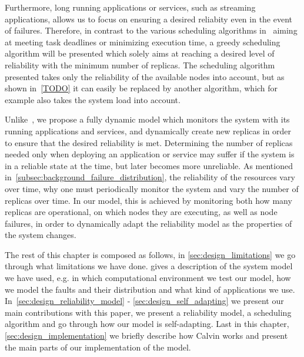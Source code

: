 \documentclass{cslthse-msc}
\begin{document}
Furthermore, long running applications or services, such as streaming applications, allows us to focus on ensuring a desired reliabity even in the event of failures. Therefore, in contrast to the various scheduling algorithms in~\cite{algoOptTimeMaxRel, optTaskAllocationForMaxRel, taskAllocation, taskAllocationSwarm, algoMaxRelEndToEndConstraint, algoMinExTime, schedReplicas} aiming at meeting task deadlines or minimizing execution time, a greedy scheduling algorithm will be presented which solely aims at reaching a desired level of reliability with the minimum number of replicas. The scheduling algorithm presented takes only the reliability of the available nodes into account, but as shown in~\ref{TODO} it can easily be replaced by another algorithm, which for example also takes the system load into account.

Unlike~\cite{designFaultTolerantSched, evalReplicationSched, taskSchedulingReplication, effTaskReplMobGrid, relGridServicePredConstraint}, we propose a fully dynamic model which monitors the system with its running applications and services, and dynamically create new replicas in order to ensure that the desired reliability is met. Determining the number of replicas needed only when deploying an application or service may suffer if the system is in a reliable state at the time, but later becomes more unreliable. As mentioned in~\cref{subsec:background_failure_distribution}, the reliability of the resources vary over time, why one must periodically monitor the system and vary the number of replicas over time. In our model, this is achieved by monitoring both how many replicas are operational, on which nodes they are executing, as well as node failures, in order to dynamically adapt the reliability model as the properties of the system changes.

The rest of this chapter is composed as follows, in \cref{sec:design_limitations} we go through what limitations we have done.  gives a description of the system model we have used, e.g. in which computational environment we test our model, how we model the faults and their distribution and what kind of applications we use. In~\cref{sec:design_reliability_model} - \cref{sec:design_self_adapting} we present our main contributions with this paper, we present a reliability model, a scheduling algorithm and go through how our model is self-adapting. Last in this chapter, \cref{sec:design_implementation} we briefly describe how Calvin works and present the main parts of our implementation of the model.
\end{document}
